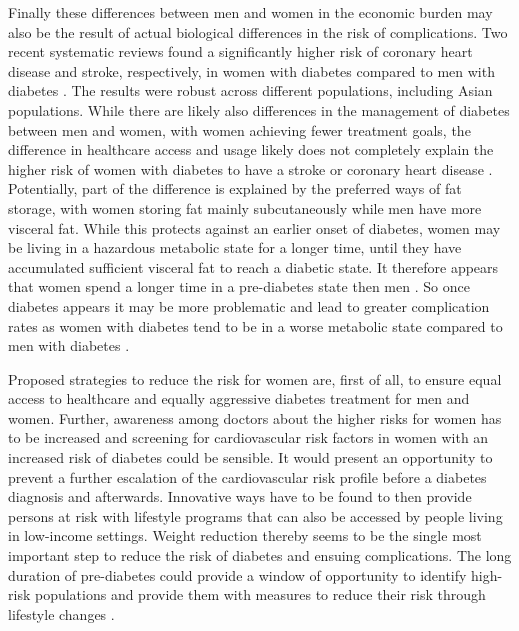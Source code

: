 Finally these differences between men and women in the economic burden may also be the result of actual biological differences in the risk of complications. Two recent systematic reviews found a significantly higher risk of coronary heart disease and stroke, respectively, in women with diabetes compared to men with diabetes \parencite{Peters2014a,Peters2014}. The results were robust across different populations, including Asian populations. While there are likely also differences in the management of diabetes between men and women, with women achieving fewer treatment goals, the difference in healthcare access and usage likely does not completely explain the higher risk of women with diabetes to have a stroke or coronary heart disease \parencite{Peters2015,Peters2014a,Peters2014}. Potentially, part of the difference is explained by the preferred ways of fat storage, with women storing fat mainly subcutaneously while men have more visceral fat. While this protects against an earlier onset of diabetes, women may be living in a hazardous metabolic state for a longer time, until they have accumulated sufficient visceral fat to reach a diabetic state. It therefore appears that women spend a longer time in a pre-diabetes state then men \parencite{Bertram2010}. So once diabetes appears it may be more problematic and lead to greater complication rates as women with diabetes tend to be in a worse metabolic state compared to men with diabetes \parencite{Pieters2015}. 

Proposed strategies to reduce the risk for women are, first of all, to ensure equal access to healthcare and equally aggressive diabetes treatment for men and women. Further, awareness among doctors about the higher risks for women has to be increased and screening for cardiovascular risk factors in women with an increased risk of diabetes could be sensible. It would present an opportunity to prevent a further escalation of the cardiovascular risk profile before a diabetes diagnosis and afterwards. Innovative ways have to be found to then provide persons at risk with lifestyle programs that can also be accessed by people living in low-income settings. Weight reduction thereby seems to be the single most important step to reduce the risk of diabetes and ensuing complications. The long duration of pre-diabetes could provide a window of opportunity to identify high-risk populations and provide them with measures to reduce their risk through lifestyle changes \parencite{Peters2015}.

